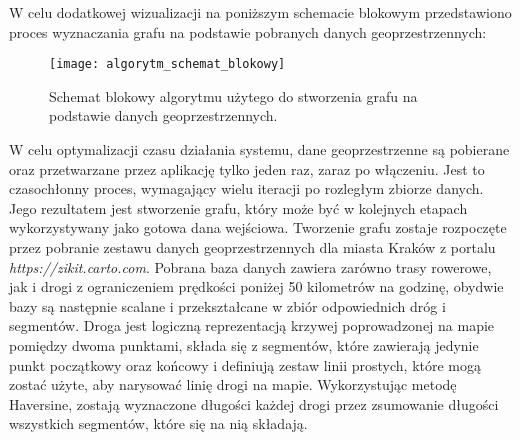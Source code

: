 W celu dodatkowej wizualizacji na poniższym schemacie blokowym przedstawiono proces wyznaczania grafu na podstawie pobranych danych geoprzestrzennych:

\begin{figure}[H]
\centering
\texttt{[image: algorytm\_schemat\_blokowy]}
\caption{Schemat blokowy algorytmu użytego do stworzenia grafu na podstawie danych geoprzestrzennych.}
\end{figure}

W celu optymalizacji czasu działania systemu, dane geoprzestrzenne są pobierane oraz przetwarzane przez aplikację tylko jeden raz, zaraz po włączeniu. Jest to czasochłonny proces, wymagający wielu iteracji po rozległym zbiorze danych. Jego rezultatem jest stworzenie grafu, który może być w kolejnych etapach wykorzystywany jako gotowa dana wejściowa. Tworzenie grafu zostaje rozpoczęte przez pobranie zestawu danych geoprzestrzennych dla miasta Kraków z portalu \textit{https://zikit.carto.com}. Pobrana baza danych zawiera zarówno trasy rowerowe, jak i drogi z ograniczeniem prędkości poniżej 50 kilometrów na godzinę, obydwie bazy są następnie scalane i przekształcane w zbiór odpowiednich dróg i segmentów. Droga jest logiczną reprezentacją krzywej poprowadzonej na mapie pomiędzy dwoma punktami, składa się z segmentów, które zawierają jedynie punkt początkowy oraz końcowy i definiują zestaw linii prostych, które mogą zostać użyte, aby narysować linię drogi na mapie. Wykorzystując metodę Haversine, zostają wyznaczone długości każdej drogi przez zsumowanie długości wszystkich segmentów, które się na nią składają. \newline
